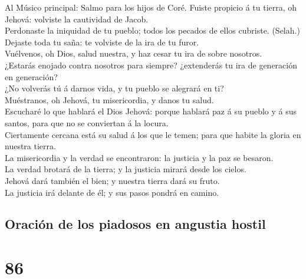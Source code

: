  Al Músico principal: Salmo para los hijos de Coré. Fuiste
propicio á tu tierra, oh Jehová: volviste la cautividad de Jacob.\\
 Perdonaste la iniquidad de tu pueblo; todos los pecados
de ellos cubriste. (Selah.)\\
 Dejaste toda tu saña: te volviste de la ira de tu
furor.\\
 Vuélvenos, oh Dios, salud nuestra, y haz cesar tu ira de
sobre nosotros.\\
 ¿Estarás enojado contra nosotros para siempre?
¿extenderás tu ira de generación en generación?\\
 ¿No volverás tú á darnos vida, y tu pueblo se alegrará en
ti?\\
 Muéstranos, oh Jehová, tu misericordia, y danos tu
salud.\\
 Escucharé lo que hablará el Dios Jehová: porque hablará
paz á su pueblo y á sus santos, para que no se conviertan á la locura.\\
 Ciertamente cercana está su salud á los que le temen;
para que habite la gloria en nuestra tierra.\\
 La misericordia y la verdad se encontraron: la justicia
y la paz se besaron.\\
 La verdad brotará de la tierra; y la justicia mirará
desde los cielos.\\
 Jehová dará también el bien; y nuestra tierra dará su
fruto.\\
 La justicia irá delante de él; y sus pasos pondrá en
camino.

\hypertarget{oraciuxf3n-de-los-piadosos-en-angustia-hostil}{%
\subsection{Oración de los piadosos en angustia
hostil}\label{oraciuxf3n-de-los-piadosos-en-angustia-hostil}}

\hypertarget{section-85}{%
\section{86}\label{section-85}}

